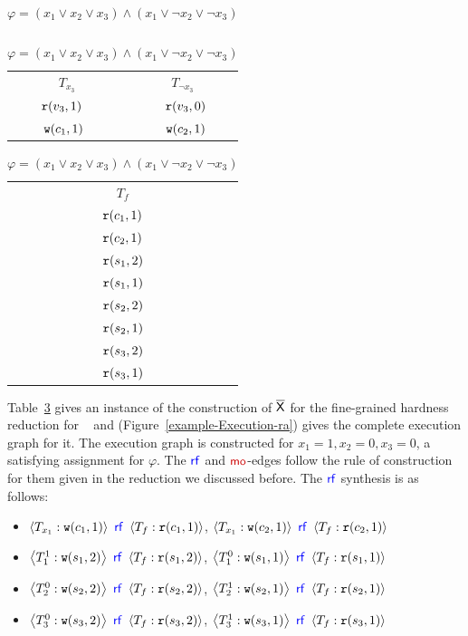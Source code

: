 \begin{table}[h]
\begin{minipage}{0.15\textwidth}
\begin{tabular}{c | c}
\end{tabular}
\vspace{.1cm}

\begin{tabular}{c | c}
    $T_{x_3}$ & $T_{\neg x_3}$ \\
    $\mathtt{r}(v_3,1)$ ~& ~$\mathtt{r}(v_3,0)$ \\ 
    $\mathtt{w}(c_1,1)$~ & ~$\mathtt{w}(c_2,1)$ \\ 
    
   
\end{tabular}
\end{minipage}
\hfill
\begin{minipage}{0.15\textwidth}
\centering
\begin{tabular}{c}
    $T_f$ \\
    $\mathtt{r}(c_1, 1)$ \\
    $\mathtt{r}(c_2, 1)$ \\
    $\mathtt{r}(s_1, 2)$ \\
    $\mathtt{r}(s_1, 1)$ \\
    $\mathtt{r}(s_2, 2)$ \\
    $\mathtt{r}(s_2, 1)$ \\
    $\mathtt{r}(s_3, 2)$ \\
    $\mathtt{r}(s_3, 1)$ \\

\end{tabular}
\end{minipage}
\vspace{2em}
\caption{$\varphi=(x_1\lor x_2\lor x_3)\land (x_1 \lor \neg x_2\lor \neg x_3)$}
    \label{tab:example-finegrainedwra}
\end{table}

Table~\ref{tab:example-finegrainedwra} gives an instance of the construction of $\overline{\mathsf{\color{black}X}}$ for the fine-grained hardness reduction for \threewriter~ and (Figure~\ref{example-Execution-ra}) gives the complete execution graph for it. The execution graph is constructed for $x_1=1, x_2=0, x_3=0$, a satisfying assignment for $\varphi$. The $\rf$ and $\mo$-edges follow the rule of construction for them given in the reduction we discussed before. The $\rf$ synthesis is as follows:
\begin{itemize}
    \item $\tuple{T_{x_1}:\wt(c_1,1)}~\rf~\tuple{T_f:\rd(c_1,1)}$, $\tuple{T_{x_1}:\wt(c_2,1)}~\rf~\tuple{T_f:\rd(c_2,1)}$
    \item $\tuple{T_1^1:\wt(s_1,2)}~\rf~\tuple{T_f:\rd(s_1,2)}$, $\tuple{T_1^0:\wt(s_1,1)}~\rf~\tuple{T_f:\rd(s_1,1)}$
    \item $\tuple{T_2^0:\wt(s_2,2)}~\rf~\tuple{T_f:\rd(s_2,2)}$, $\tuple{T_2^1:\wt(s_2,1)}~\rf~\tuple{T_f:\rd(s_2,1)}$
    \item $\tuple{T_3^0:\wt(s_3,2)}~\rf~\tuple{T_f:\rd(s_3,2)}$, $\tuple{T_3^1:\wt(s_3,1)}~\rf~\tuple{T_f:\rd(s_3,1)}$
\end{itemize}

